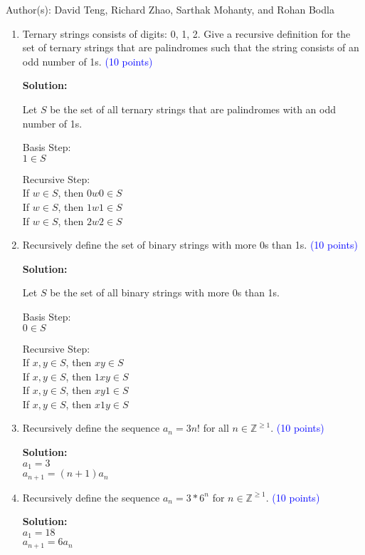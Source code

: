 \documentclass{article}
\newcommand{\pt}[1]{\textcolor{blue}{(#1 points)}}
\newenvironment{solution}
{
\par
\color{blue}
\textbf{Solution:}
}
{
\par
}
\begin{document}
Author(s): David Teng, Richard Zhao, Sarthak Mohanty, and Rohan Bodla
\newpage
\begin{enumerate}

\item Ternary strings consists of digits: 0, 1, 2.  Give a recursive definition for the set of ternary strings that are palindromes such that the string consists of an odd number of 1s. \pt{10}
\begin{solution}
Let $S$ be the set of all ternary strings that are palindromes with an odd number of 1s.

Basis Step:\\
$1 \in S$

Recursive Step:\\
If $w \in S$, then $0w0 \in S$\\
If $w \in S$, then $1w1 \in S$\\
If $w \in S$, then $2w2 \in S$
\end{solution}

\item Recursively define the set of binary strings with more 0s than 1s. \pt{10}
\begin{solution}
Let $S$ be the set of all binary strings with more 0s than 1s.

Basis Step:\\
$0 \in S$

Recursive Step:\\
If $x,y \in S$, then $xy \in S$\\
If $x,y \in S$, then $1xy \in S$\\
If $x,y \in S$, then $xy1 \in S$\\
If $x,y \in S$, then $x1y \in S$\\

\end{solution}

\item Recursively define the sequence $a_n = 3n!$ for all $n \in \mathbb{Z}^{\geq 1}$. \pt{10}
\begin{solution}\\
$a_1 = 3$\\
$a_{n+1} = (n + 1) a_{n}$
\end{solution}

\item Recursively define the sequence $a_n = 3 * 6^n$ for $n \in \mathbb{Z}^{\geq 1}$. \pt{10}
\begin{solution} \\
    $a_1 = 18$ \\
    $a_{n+1} = 6a_{n}$
\end{solution}


\end{enumerate}
\end{document}
